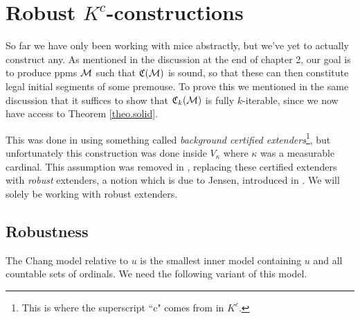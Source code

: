 \chapter{Robust $K^c$-constructions}
\thispagestyle{fancy}
\label{ch6}

So far we have only been working with mice abstractly, but we've yet to actually construct any. As mentioned in the discussion at the end of chapter 2, our goal is to produce ppms $\operatorname{\mathcal{M}}$ such that $\mathfrak C(\operatorname{\mathcal{M}})$ is sound, so that these can then constitute legal initial segments of some premouse. To prove this we mentioned in the same discussion that it suffices to show that $\mathfrak C_k(\operatorname{\mathcal{M}})$ is fully $k$-iterable, since we now have access to Theorem \ref{theo.solid}.

\qquad This was done in \cite{CMIP} using something called \textit{background certified extenders}\footnote{This is where the superscript ``c" comes from in $K^c$.}, but unfortunately this construction was done inside $V_\kappa$ where $\kappa$ was a measurable cardinal. This assumption was removed in \cite{Kwithoutmeasurable}, replacing these certified extenders with \textit{robust} extenders, a notion which is due to Jensen, introduced in \cite{RobustExtenders}. We will solely be working with robust extenders.


\section{Robustness}


The Chang model relative to $u$ is the smallest inner model containing $u$ and all countable sets of ordinals. We need the following variant of this model.


